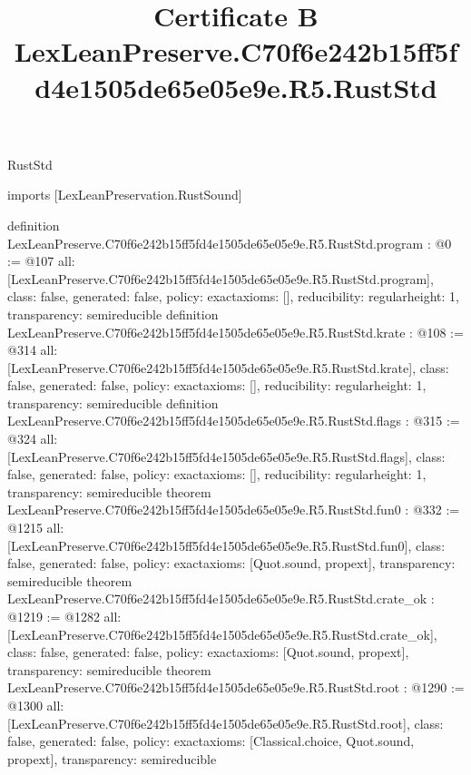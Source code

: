 \begin{lexlean}{RustStd}
\title{Certificate B LexLeanPreserve.C70f6e242b15ff5fd4e1505de65e05e9e.R5.RustStd}
\begin{coremodule}
imports [LexLeanPreservation.RustSound]

definition LexLeanPreserve.C70f6e242b15ff5fd4e1505de65e05e9e.R5.RustStd.program : @0 := @107 {
  all: [LexLeanPreserve.C70f6e242b15ff5fd4e1505de65e05e9e.R5.RustStd.program],
  class: false,
  generated: false,
  policy: exact{axioms: []},
  reducibility: regular{height: 1},
  transparency: semireducible
}
definition LexLeanPreserve.C70f6e242b15ff5fd4e1505de65e05e9e.R5.RustStd.krate : @108 := @314 {
  all: [LexLeanPreserve.C70f6e242b15ff5fd4e1505de65e05e9e.R5.RustStd.krate],
  class: false,
  generated: false,
  policy: exact{axioms: []},
  reducibility: regular{height: 1},
  transparency: semireducible
}
definition LexLeanPreserve.C70f6e242b15ff5fd4e1505de65e05e9e.R5.RustStd.flags : @315 := @324 {
  all: [LexLeanPreserve.C70f6e242b15ff5fd4e1505de65e05e9e.R5.RustStd.flags],
  class: false,
  generated: false,
  policy: exact{axioms: []},
  reducibility: regular{height: 1},
  transparency: semireducible
}
theorem LexLeanPreserve.C70f6e242b15ff5fd4e1505de65e05e9e.R5.RustStd.fun0 : @332 := @1215 {
  all: [LexLeanPreserve.C70f6e242b15ff5fd4e1505de65e05e9e.R5.RustStd.fun0],
  class: false,
  generated: false,
  policy: exact{axioms: [Quot.sound, propext]},
  transparency: semireducible
}
theorem LexLeanPreserve.C70f6e242b15ff5fd4e1505de65e05e9e.R5.RustStd.crate_ok : @1219 := @1282 {
  all: [LexLeanPreserve.C70f6e242b15ff5fd4e1505de65e05e9e.R5.RustStd.crate_ok],
  class: false,
  generated: false,
  policy: exact{axioms: [Quot.sound, propext]},
  transparency: semireducible
}
theorem LexLeanPreserve.C70f6e242b15ff5fd4e1505de65e05e9e.R5.RustStd.root : @1290 := @1300 {
  all: [LexLeanPreserve.C70f6e242b15ff5fd4e1505de65e05e9e.R5.RustStd.root],
  class: false,
  generated: false,
  policy: exact{axioms: [Classical.choice, Quot.sound, propext]},
  transparency: semireducible
}


\end{coremodule}
\end{lexlean}
